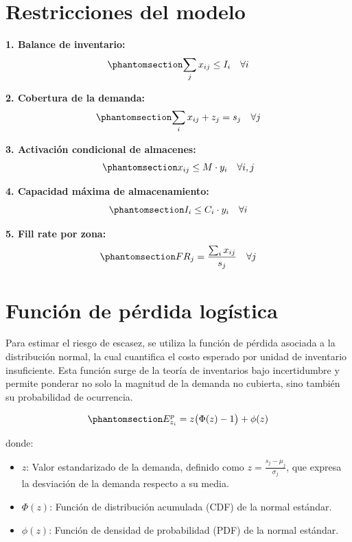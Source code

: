\documentclass[
  spanish,
  us-letterpaper,
  DIV=11,
  numbers=noendperiod]{scrreprt}
\providecommand{\tightlist}{%
  \setlength{\itemsep}{0pt}\setlength{\parskip}{0pt}}
\numberwithin{equation}{section}
\begin{document}
\section{Restricciones del modelo}\label{restricciones-del-modelo}

\textbf{1. Balance de inventario:}
\begin{equation}\phantomsection\label{eq-1b}{
\sum_j x_{ij} \leq I_i \quad \forall i 
}\end{equation}

\textbf{2. Cobertura de la demanda:}
\begin{equation}\phantomsection\label{eq-2c}{
\sum_i x_{ij} + z_j = s_j \quad \forall j 
}\end{equation}

\textbf{3. Activación condicional de almacenes:}
\begin{equation}\phantomsection\label{eq-3a}{
x_{ij} \leq M \cdot y_i \quad \forall i,j 
}\end{equation}

\textbf{4. Capacidad máxima de almacenamiento:}
\begin{equation}\phantomsection\label{eq-4c}{
I_i \leq C_i \cdot y_i \quad \forall i 
}\end{equation}

\textbf{5. Fill rate por zona:}
\begin{equation}\phantomsection\label{eq-5f}{
FR_j = \frac{\sum_i x_{ij}}{s_j} \quad \forall j 
}\end{equation}

\section{Función de pérdida
logística}\label{funciuxf3n-de-puxe9rdida-loguxedstica}

Para estimar el riesgo de escasez, se utiliza la función de pérdida
asociada a la distribución normal, la cual cuantifica el costo esperado
por unidad de inventario insuficiente. Esta función surge de la teoría
de inventarios bajo incertidumbre y permite ponderar no solo la magnitud
de la demanda no cubierta, sino también su probabilidad de ocurrencia.

\begin{equation}\phantomsection\label{eq-E_z}{
E_{z_i}^p = z \big( \Phi(z)-1 \big) + \phi(z) 
}\end{equation}

donde:

\begin{itemize}
\tightlist
\item
  \(z\): Valor estandarizado de la demanda, definido como
  \(\displaystyle z = \frac{s_j - \mu_j}{\sigma_j}\), que expresa la
  desviación de la demanda respecto a su media.\\
\item
  \(\Phi(z)\): Función de distribución acumulada (CDF) de la normal
  estándar.\\
\item
  \(\phi(z)\): Función de densidad de probabilidad (PDF) de la normal
  estándar.
\end{itemize}
\end{document}
